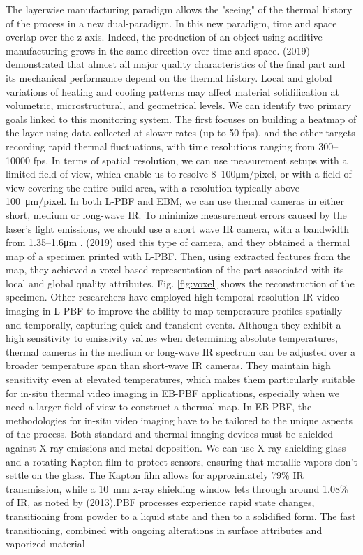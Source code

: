 The layerwise manufacturing paradigm allows the "seeing" of the thermal history of the process in a new dual-paradigm. In this new paradigm, time and space overlap over the z-axis. Indeed, the production of an object using additive manufacturing grows in the same direction over time and space. \citeauthor{williams_situ_2019} (2019) demonstrated that almost all major quality characteristics of the final part and its mechanical performance depend on the thermal history. Local and global variations of heating and cooling patterns may affect material solidification at volumetric, microstructural, and geometrical levels. We can identify two primary goals linked to this monitoring system. The first focuses on building a heatmap of the layer using data collected at slower rates (up to 50 fps), and the other targets recording rapid thermal fluctuations, with time resolutions ranging from \numrange{300}{10000} \unit{fps}. In terms of spatial resolution, we can use measurement setups with a limited field of view, which enable us to resolve \numrange[range-phrase=--]{8}{100}\unit{\micro\metre / pixel}, or with a field of view covering the entire build area, with a resolution typically above \SI{100}{\micro\metre / pixel}. In both L-PBF and EBM, we can use thermal cameras in either short, medium or long-wave IR. To minimize measurement errors caused by the laser's light emissions, we should use a short wave IR camera, with a bandwidth from \numrange{1.35}{1.6}\unit{\micro\metre} \cite{heigel_situ_2020}. \citeauthor{lough_-situ_2019} (2019) used this type of camera, and they obtained a thermal map of a specimen printed with L-PBF. Then, using extracted features from the map, they achieved a voxel-based representation of the part associated with its local and global quality attributes. Fig. \ref{fig:voxel} shows the reconstruction of the specimen. Other researchers have employed high temporal resolution IR video imaging in L-PBF to improve the ability to map temperature profiles spatially and temporally, capturing quick and transient events. Although they exhibit a high sensitivity to emissivity values when determining absolute temperatures, thermal cameras in the medium or long-wave IR spectrum can be adjusted over a broader temperature span than short-wave IR cameras. They maintain high sensitivity even at elevated temperatures, which makes them particularly suitable for in-situ thermal video imaging in EB-PBF applications, especially when we need a larger field of view to construct a thermal map. In EB-PBF, the methodologies for in-situ video imaging have to be tailored to the unique aspects of the process. Both standard and thermal imaging devices must be shielded against X-ray emissions and metal deposition. We can use X-ray shielding glass and a rotating Kapton film to protect sensors, ensuring that metallic vapors don't settle on the glass. The Kapton film allows for approximately 79\% IR transmission, while a \SI{10}{\milli\metre} x-ray shielding window lets through around 1.08\% of IR, as noted by \citeauthor{ralph_b_dinwiddie_thermographic_2013} (2013).PBF processes experience rapid state changes, transitioning from powder to a liquid state and then to a solidified form. The fast transitioning, combined with ongoing alterations in surface attributes and vaporized material 